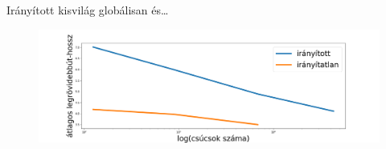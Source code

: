\documentclass{beamer}
\newlength{\onecolwid}
\begin{document}
\begin{frame}[t]
\begin{columns}[t]
\begin{column}{\onecolwid}

        \bigskip

        \begin{block}{Irányított kisvilág globálisan és\dots}%
          \begin{figure} 
            \includegraphics[width=\columnwidth]{img/avg-shortest-path-length}

          \end{figure}
        \end{block}

        \bigskip


\end{column}
\end{columns}
\end{frame}
\end{document}
